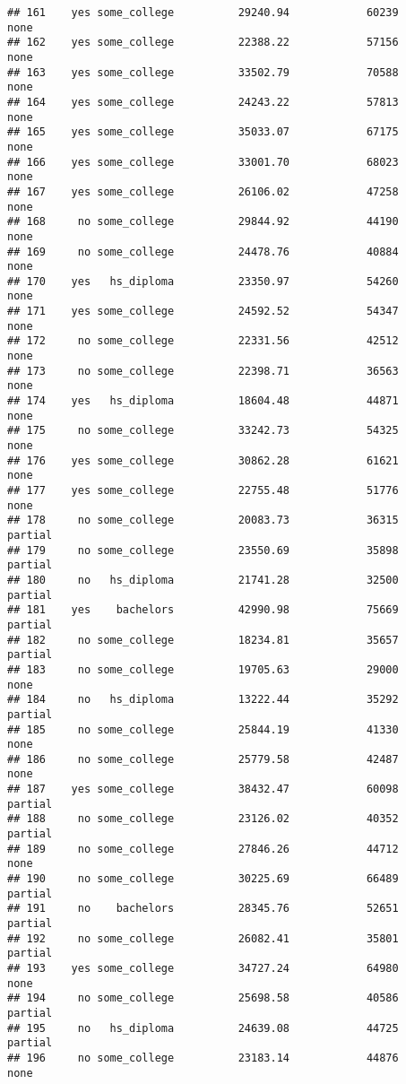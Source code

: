 \documentclass[
]{article}
\begin{document}
\begin{verbatim}
## 161    yes some_college          29240.94            60239        none
## 162    yes some_college          22388.22            57156        none
## 163    yes some_college          33502.79            70588        none
## 164    yes some_college          24243.22            57813        none
## 165    yes some_college          35033.07            67175        none
## 166    yes some_college          33001.70            68023        none
## 167    yes some_college          26106.02            47258        none
## 168     no some_college          29844.92            44190        none
## 169     no some_college          24478.76            40884        none
## 170    yes   hs_diploma          23350.97            54260        none
## 171    yes some_college          24592.52            54347        none
## 172     no some_college          22331.56            42512        none
## 173     no some_college          22398.71            36563        none
## 174    yes   hs_diploma          18604.48            44871        none
## 175     no some_college          33242.73            54325        none
## 176    yes some_college          30862.28            61621        none
## 177    yes some_college          22755.48            51776        none
## 178     no some_college          20083.73            36315     partial
## 179     no some_college          23550.69            35898     partial
## 180     no   hs_diploma          21741.28            32500     partial
## 181    yes    bachelors          42990.98            75669     partial
## 182     no some_college          18234.81            35657     partial
## 183     no some_college          19705.63            29000        none
## 184     no   hs_diploma          13222.44            35292     partial
## 185     no some_college          25844.19            41330        none
## 186     no some_college          25779.58            42487        none
## 187    yes some_college          38432.47            60098     partial
## 188     no some_college          23126.02            40352     partial
## 189     no some_college          27846.26            44712        none
## 190     no some_college          30225.69            66489     partial
## 191     no    bachelors          28345.76            52651     partial
## 192     no some_college          26082.41            35801     partial
## 193    yes some_college          34727.24            64980        none
## 194     no some_college          25698.58            40586     partial
## 195     no   hs_diploma          24639.08            44725     partial
## 196     no some_college          23183.14            44876        none

\end{verbatim}
\end{document}
